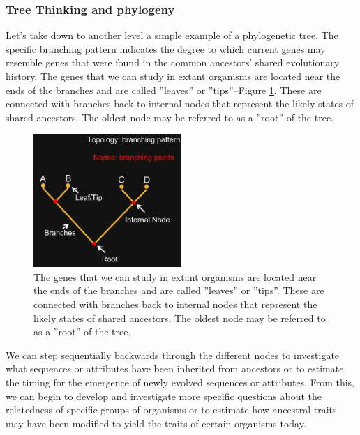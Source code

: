 \documentclass[]{article}
\begin{document}
\subsubsection{Tree Thinking and phylogeny}


Let's take down to another level
a simple example of a phylogenetic tree.
The specific branching pattern
indicates the degree to which
current genes may resemble genes
that were found
in the common ancestors'
shared evolutionary history.
The genes that we can study
in extant organisms
are located near the ends of the branches
and are called ''leaves'' or ''tips''--Figure \ref{fig:TreeTerminology}.
These are connected with branches
back to internal nodes
that represent the likely states
of shared ancestors.
The oldest node may be referred to
as a ''root'' of the tree.

\begin{figure}[H]
	\begin{center}
		\caption[Tree Terminology]{The genes that we can study
			in extant organisms
			are located near the ends of the branches
			and are called ''leaves'' or ''tips''.
			These are connected with branches
			back to internal nodes
			that represent the likely states
			of shared ancestors.
			The oldest node may be referred to
			as a ''root'' of the tree.}\label{fig:TreeTerminology}
		\includegraphics[width=0.5\textwidth]{TreeTerminology}
	\end{center}
\end{figure}

We can step sequentially backwards
through the different nodes
to investigate
what sequences or attributes
have been inherited from ancestors
or to estimate the timing
for the emergence
of newly evolved sequences or attributes.
From this, we can begin to develop
and investigate more specific questions
about the relatedness
of specific groups of organisms
or to estimate how ancestral traits
may have been modified
to yield the traits
of certain organisms today.
\end{document}

